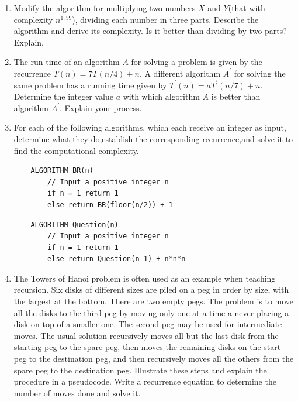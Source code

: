 \documentclass{article}
\begin{document}
\begin{enumerate}
    \item  Modify the algorithm for multiplying two numbers $X$ and $Y$(that with complexity $n^{1,59}$), dividing each number in three parts. Describe the algorithm and derive its complexity. Is it better than dividing by two parts? Explain.
    \item The run time of an algorithm $A$ for solving a problem is given by the recurrence $T(n) = 7T(n/4) + n.$ A different algorithm $A^{\prime}$ for solving the same problem has a running time given by $T^{\prime}(n) =aT^{\prime}(n/7) +n$. Determine  the  integer  value $a$ with  which  algorithm $A$ is  better  than  algorithm $A^{\prime}$.  Explain  your process.
    \item For each of the following algorithms, which each receive an integer as input, determine what they do,establish the corresponding recurrence,and solve it to find the computational complexity.
    \begin{lstlisting}
    ALGORITHM BR(n)
        // Input a positive integer n
        if n = 1 return 1
        else return BR(floor(n/2)) + 1
    \end{lstlisting}

    \begin{lstlisting}
    ALGORITHM Question(n)
        // Input a positive integer n
        if n = 1 return 1
        else return Question(n-1) + n*n*n
    \end{lstlisting}

    \item The Towers of Hanoi problem is often used as an example when teaching recursion. Six disks of different sizes are piled on a peg in order by size, with the largest at the bottom. There are two empty pegs. The problem is to move all the disks to the third peg by moving only one at a time a never placing a disk on top of a smaller one. The second peg may be used for intermediate moves. The usual solution recursively moves all but the last disk from the starting peg to the spare peg, then moves the remaining disks on the start peg to the destination peg, and then recursively moves all the others from the spare peg to the destination peg. Illustrate these steps and explain the procedure in a pseudocode. Write a recurrence equation to determine the number of moves done and solve it.
\end{enumerate}
\end{document}
